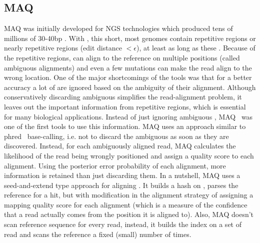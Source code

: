 \subsection{MAQ~\citep{maq}} \label{maq}
MAQ was initially developed for NGS technologies which produced tens of millions of 30-40bp \reads. With \reads, this short, most genomes contain repetitive regions or nearly repetitive regions (edit distance $< \epsilon$), at least as long as these \reads. Because of the repetitive regions, \reads can align to the reference on multiple positions (called ambiguous alignments) and even a few mutations can make the read align to the wrong location. One of the major shortcomings of the \ra tools was that for a better accuracy a lot of \reads are ignored based on the ambiguity of their alignment. Although conservatively discarding ambiguous \reads simplifies the read-alignment problem, it leaves out the important information from repetitive regions, which is essential for many biological applications. Instead of just ignoring ambiguous \reads, MAQ~\citep{maq} was one of the first tools to use this information. MAQ uses an approach similar to phred~\citep{ewing1998base} base-calling, i.e. not to discard the ambiguous \reads as soon as they are discovered. Instead, for each ambiguously aligned read, MAQ calculates the likelihood of the read being wrongly positioned and assign a quality score to each alignment. Using the posterior error probability of each alignment, more information is retained than just discarding them. In a nutshell, MAQ uses a seed-and-extend type approach for aligning \reads. It builds a hash on \reads, parses the reference for a hit, but with modification in the alignment strategy of assigning a mapping quality score for each alignment (which is a measure of the confidence that a read actually comes from the position it is aligned to). Also, MAQ doesn't scan reference sequence for every read, instead, it builds the index on a set of read and scans the reference a fixed (small) number of times.

